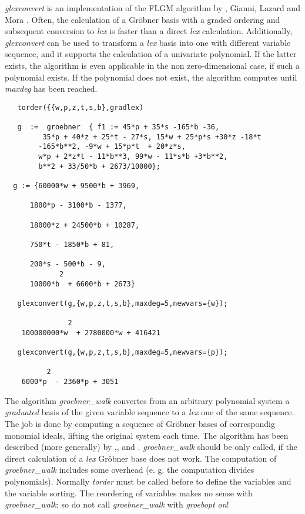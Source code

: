 \emph{glexconvert} is an implementation of the FLGM algorithm by
, {\sc Gianni}, {\sc Lazard} and {\sc
Mora} \cite{Faugere:93}. Often, the calculation of a Gr\"obner basis
with a graded ordering and subsequent conversion to {\it lex} is
faster than a direct {\it lex} calculation. Additionally, \emph{glexconvert}
can be used to transform a {\it lex} basis into one with different
variable sequence, and it supports the calculation of a univariate
polynomial. If the latter exists, the algorithm is even applicable in
the non zero-dimensional case, if such a polynomial exists.
If the polynomial does not exist, the algorithm computes  until \emph{maxdeg}
has been reached.
\begin{verbatim}
   torder({{w,p,z,t,s,b},gradlex)

   g  :=  groebner  { f1 := 45*p + 35*s -165*b -36,
         35*p + 40*z + 25*t - 27*s, 15*w + 25*p*s +30*z -18*t
        -165*b**2, -9*w + 15*p*t  + 20*z*s,
        w*p + 2*z*t - 11*b**3, 99*w - 11*s*b +3*b**2,
        b**2 + 33/50*b + 2673/10000};

  g := {60000*w + 9500*b + 3969,

      1800*p - 3100*b - 1377,

      18000*z + 24500*b + 10287,

      750*t - 1850*b + 81,

      200*s - 500*b - 9,
             2
      10000*b  + 6600*b + 2673}

   glexconvert(g,{w,p,z,t,s,b},maxdeg=5,newvars={w});

               2
    100000000*w  + 2780000*w + 416421

   glexconvert(g,{w,p,z,t,s,b},maxdeg=5,newvars={p});

          2
    6000*p  - 2360*p + 3051
\end{verbatim}

The algorithm \emph{groebner\_walk} convertes from an arbitrary polynomial
system a \emph{graduated} basis of the given variable sequence to a \emph{lex} one
of the same sequence. The job is done by computing a sequence
of Gr\"obner bases of correspondig monomial ideals, lifting the original
system each time. The algorithm has been described (more generally) by
\cite{AmrheinGloorKuechlin:96a},\cite{AmrheinGloorKuechlin:96b},\cite{AmrheinGloor:98} and \cite{Collart:97}.
\emph{groebner\_walk} should be only called, if the direct calculation of a
\emph{lex} Gr\"obner base does not work. The computation of \emph{groebner\_walk}
includes some overhead (e. g. the computation divides polynomials).
Normally \emph{torder} must be called before to define the variables and the variable
sorting. The reordering of variables makes no sense with \emph{groebner\_walk};
so do not call \emph{groebner\_walk} with \emph{groebopt on}!

